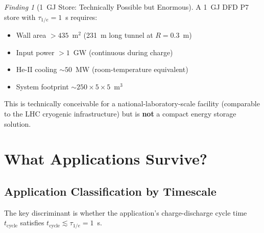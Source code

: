 \documentclass[11pt]{article}
\theoremstyle{definition}
\theoremstyle{remark}
\newtheorem{finding}[theorem]{Finding}
\begin{document}
\begin{finding}[1~GJ Store: Technically Possible but Enormous]
\label{finding:1GJ-scale}
A 1~GJ DFD P7 store with $\tau_{1/e} = 1$~s requires:
\begin{itemize}[nosep]
\item Wall area $> 435$~m$^2$ (231~m long tunnel at $R = 0.3$~m)
\item Input power $> 1$~GW (continuous during charge)
\item He-II cooling $\sim 50$~MW (room-temperature equivalent)
\item System footprint $\sim 250 \times 5 \times 5$~m$^3$
\end{itemize}
This is technically conceivable for a national-laboratory-scale facility
(comparable to the LHC cryogenic infrastructure) but is \textbf{not}
a compact energy storage solution.
\end{finding}

\section{What Applications Survive?}
\label{sec:P7-applications}

\subsection{Application Classification by Timescale}

The key discriminant is whether the application's charge-discharge cycle
time $t_{\mathrm{cycle}}$ satisfies $t_{\mathrm{cycle}} \lesssim \tau_{1/e} = 1$~s.
\end{document}
